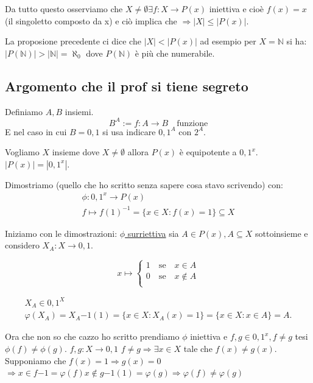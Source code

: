 \documentclass{article}
\begin{document}
Da tutto questo osserviamo che $X \not = \emptyset \exists f : X \to P(x)$ iniettiva e cioè $f(x) = {x}$ (il singoletto composto da x) e ciò implica che $\Rightarrow |X| \le |P(x)|$. 

La proposione precedente ci dice che $|X| < |P(x)|$ ad esempio per $X = \mathbb{N}$ si ha: \newline
$|P(\mathbb{N})| > |\mathbb{N}| = \aleph_0 $ dove $P(\mathbb{N})$ è più che numerabile.

\subsection{Argomento che il prof si tiene segreto}
Definiamo $A,B$ insiemi.
\begin{equation}
        B^A := {f:A \to B \quad \mbox{funzione}}
\end{equation}
E nel caso in cui $B = {0,1}$ si usa indicare ${0,1}^A$ con $2^A$.


Vogliamo $X$ insieme dove $X \not = \emptyset$ allora $P(x)$ è equipotente a ${0,1}^x$. \newline
$|P(x)| = |{0,1}^x|$.

Dimostriamo (quello che ho scritto senza sapere cosa stavo scrivendo) con:
\begin{align*}
        \phi : {0,1}^x \to P(x) \\
        f \mapsto {f(1)}^{-1} = \{x \in X : f(x) = 1\} \subseteq X
\end{align*}

Iniziamo con le dimostrazioni:
\underline{$\phi$ surriettiva} sia $A \in P(x), A \subseteq X$ sottoinsieme e considero $X_A : X \to {0,1}$.



\[x \mapsto  
\begin{cases}
        1 \quad \mbox{se} \quad x \in A \\
        0 \quad \mbox{se} \quad x \not \in A \\
\end{cases}
\]

\begin{align*}
X_A \in {0,1}^X \\
\varphi(X_A) = {X_A}{-1}(1) = \{x \in X : X_A(x) = 1\} = \{x \in X : x \in A\} = A.
\end{align*}

Ora che non so che cazzo ho scritto prendiamo $\phi$ iniettiva e $f,g \in {0,1}^x, f \not = g$ tesi $\phi(f) \not = \phi(g)$.
$f,g : X \to {0,1}$ \newline
$f \not = g \Rightarrow \exists x \in X$ tale che $f(x) \not = g(x)$.
Supponiamo che $f(x) = 1 \Rightarrow g(x) = 0$ \newline
$\Rightarrow x \in {f}{-1} = \varphi(f) x \not \in {g}{-1}(1) = \varphi(g) \Rightarrow \varphi(f) \not = \varphi(g)$
\end{document}

